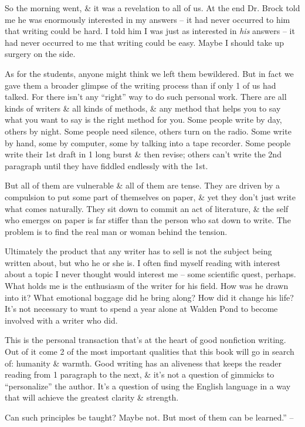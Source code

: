 \documentclass{article}
\begin{document}
So the morning went, \& it was a revelation to all of us. At the end Dr. Brock told me he was enormously interested in my answers -- it had never occurred to him that writing could be hard. I told him I was just as interested in \textit{his} answers -- it had never occurred to me that writing could be easy. Maybe I should take up surgery on the side.

As for the students, anyone might think we left them bewildered. But in fact we gave them a broader glimpse of the writing process than if only 1 of us had talked. For there isn't any ``right'' way to do such personal work. There are all kinds of writers \& all kinds of methods, \& any method that helps you to say what you want to say is the right method for you. Some people write by day, others by night. Some people need silence, others turn on the radio. Some write by hand, some by computer, some by talking into a tape recorder. Some people write their 1st draft in 1 long burst \& then revise; others can't write the 2nd paragraph until they have fiddled endlessly with the 1st.

But all of them are vulnerable \& all of them are tense. They are driven by a compulsion to put some part of themselves on paper, \& yet they don't just write what comes naturally. They sit down to commit an act of literature, \& the self who emerges on paper is far stiffer than the person who sat down to write. The problem is to find the real man or woman behind the tension.

Ultimately the product that any writer has to sell is not the subject being written about, but who he or she is. I often find myself reading with interest about a topic I never thought would interest me -- some scientific quest, perhaps. What holds me is the enthusiasm of the writer for his field. How was he drawn into it? What emotional baggage did he bring along? How did it change his life? It's not necessary to want to spend a year alone at Walden Pond to become involved with a writer who did.

This is the personal transaction that's at the heart of good nonfiction writing. Out of it come 2 of the most important qualities that this book will go in search of: humanity \& warmth. Good writing has an aliveness that keeps the reader reading from 1 paragraph to the next, \& it's not a question of gimmicks to ``personalize'' the author. It's a question of using the English language in a way that will achieve the greatest clarity \& strength.

Can such principles be taught? Maybe not. But most of them can be learned.'' -- \cite[pp. 12--13]{Zinsser2016}
\end{document}
